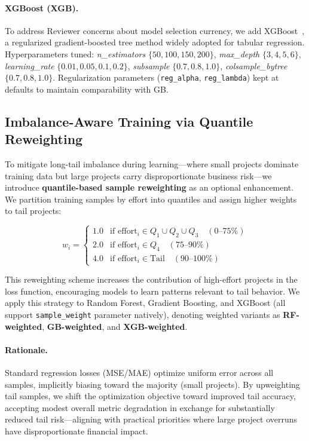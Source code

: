 \documentclass{ieeeaccess}
\begin{document}
\paragraph{XGBoost (XGB).}
To address Reviewer concerns about model selection currency, we add XGBoost~\cite{chen2016xgboost}, a regularized gradient-boosted tree method widely adopted for tabular regression.
Hyperparameters tuned:
\emph{n\_estimators} $\{50,100,150,200\}$,
\emph{max\_depth} $\{3,4,5,6\}$,
\emph{learning\_rate} $\{0.01,0.05,0.1,0.2\}$,
\emph{subsample} $\{0.7,0.8,1.0\}$,
\emph{colsample\_bytree} $\{0.7,0.8,1.0\}$.
Regularization parameters (\texttt{reg\_alpha}, \texttt{reg\_lambda}) kept at defaults to maintain comparability with GB.

\subsection{Imbalance-Aware Training via Quantile Reweighting}
\label{sec:imbalance-aware}

To mitigate long-tail imbalance during learning---where small projects dominate training data but large projects carry disproportionate business risk---we introduce \textbf{quantile-based sample reweighting} as an optional enhancement. We partition training samples by effort into quantiles and assign higher weights to tail projects:

\begin{equation}
w_i = \begin{cases}
1.0 & \text{if effort}_i \in Q_1 \cup Q_2 \cup Q_3 \quad (0\text{--}75\%) \\
2.0 & \text{if effort}_i \in Q_4 \quad (75\text{--}90\%) \\
4.0 & \text{if effort}_i \in \text{Tail} \quad (90\text{--}100\%)
\end{cases}
\end{equation}

This reweighting scheme increases the contribution of high-effort projects in the loss function, encouraging models to learn patterns relevant to tail behavior. We apply this strategy to Random Forest, Gradient Boosting, and XGBoost (all support \texttt{sample\_weight} parameter natively), denoting weighted variants as \textbf{RF-weighted}, \textbf{GB-weighted}, and \textbf{XGB-weighted}.

\paragraph{Rationale.}
Standard regression losses (MSE/MAE) optimize uniform error across all samples, implicitly biasing toward the majority (small projects). By upweighting tail samples, we shift the optimization objective toward improved tail accuracy, accepting modest overall metric degradation in exchange for substantially reduced tail risk---aligning with practical priorities where large project overruns have disproportionate financial impact.
\end{document}
